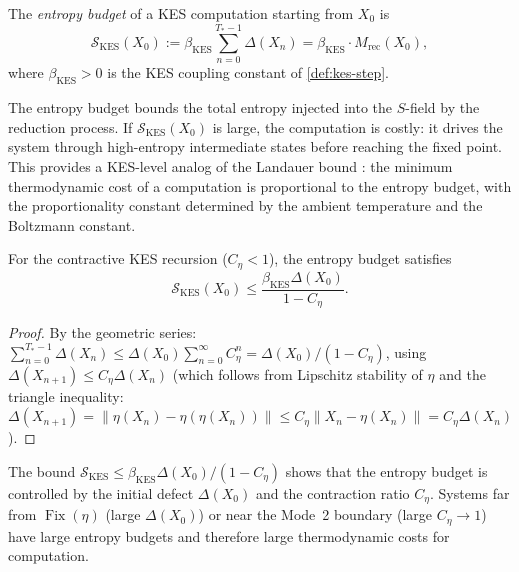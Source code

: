 \documentclass[12pt, oneside]{memoir}
\DeclareMathOperator{\Fix}{Fix}
\newcommand{\nnorm}[1]{\lVert #1 \rVert}
\begin{document}
\begin{definition}
\label{def:entropy-budget}
The \emph{entropy budget} of a KES computation starting from $X_0$ is
\begin{equation}
  \mathcal{S}_{\mathrm{KES}}(X_0) := \beta_{\mathrm{KES}}
  \sum_{n=0}^{T_*-1} \Delta(X_n)
  = \beta_{\mathrm{KES}} \cdot M_{\mathrm{rec}}(X_0),
\end{equation}
where $\beta_{\mathrm{KES}} > 0$ is the KES coupling constant of \cref{def:kes-step}.
\end{definition}

The entropy budget bounds the total entropy injected into the $S$-field by the reduction
process.  If $\mathcal{S}_{\mathrm{KES}}(X_0)$ is large, the computation is costly: it
drives the system through high-entropy intermediate states before reaching the fixed
point.  This provides a KES-level analog of the Landauer bound \cite{landauer1961}: the
minimum thermodynamic cost of a computation is proportional to the entropy budget, with
the proportionality constant determined by the ambient temperature and the Boltzmann
constant.

\begin{proposition}
\label{prop:entropy-budget}
For the contractive KES recursion ($C_\eta < 1$), the entropy budget satisfies
\begin{equation}
  \mathcal{S}_{\mathrm{KES}}(X_0) \le \frac{\beta_{\mathrm{KES}} \Delta(X_0)}{1 - C_\eta}.
\end{equation}
\end{proposition}

\begin{proof}
By the geometric series: $\sum_{n=0}^{T_*-1} \Delta(X_n) \le \Delta(X_0) \sum_{n=0}^\infty
C_\eta^n = \Delta(X_0) / (1 - C_\eta)$, using $\Delta(X_{n+1}) \le C_\eta \Delta(X_n)$
(which follows from Lipschitz stability of $\eta$ and the triangle inequality:
$\Delta(X_{n+1}) = \nnorm{\eta(X_n) - \eta(\eta(X_n))} \le C_\eta \nnorm{X_n - \eta(X_n)}
= C_\eta \Delta(X_n)$).
\end{proof}

The bound $\mathcal{S}_{\mathrm{KES}} \le \beta_{\mathrm{KES}} \Delta(X_0) /
(1 - C_\eta)$ shows that the entropy budget is controlled by the initial defect
$\Delta(X_0)$ and the contraction ratio $C_\eta$.  Systems far from $\Fix(\eta)$ (large
$\Delta(X_0)$) or near the Mode~2 boundary (large $C_\eta \to 1$) have large entropy
budgets and therefore large thermodynamic costs for computation.
\end{document}
